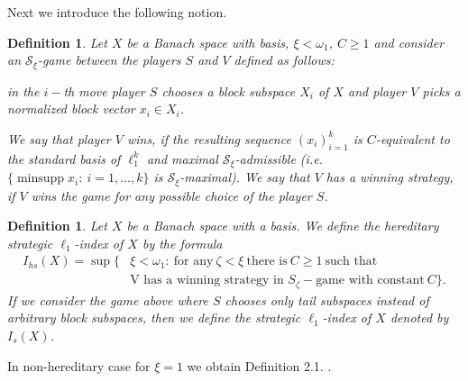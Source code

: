 \documentclass[a4paper]{amsart}
\theoremstyle{plain}
\newtheorem{definition}[theorem]{Definition}
\newcommand{\mc}{\mathcal}
\DeclareMathOperator{\minsupp}{minsupp}
\begin{document}
Next we introduce the following notion.
\begin{definition}
Let $X$ be a Banach space with basis, $\xi<\omega_{1}$, $C\geq 1$ and consider an
$\mc{S}_\xi$-game between the players $S$ and $V$ defined as follows:

in the $i-$th move player $S$ chooses a block subspace $X_i$ of $X$ and player $V$ picks a
normalized block vector $x_i\in X_i$.


We say that player $V$ wins, if the resulting sequence $(x_{i})_{i=1}^{k}$ is
$C$-equivalent to the standard basis of $\ell_{1}^{k}$ and maximal
$\mc{S}_{\xi}$-admissible (i.e.  $\{\minsupp x_i:\ i=1,\dots,k\}$ is
$\mc{S}_{\xi}$-maximal). We say that $V$ has a winning strategy, if $V$ wins the game for
any possible choice of the player $S$.
\end{definition}
\begin{definition}\label{hs}
Let $X$ be a Banach space with a basis. We define the \textit{hereditary strategic $\ell_{1}$-index} of $X$ by the formula
\begin{align*}
I_{hs}(X)= \sup\{&\xi<\omega_1:\ \text{for any}\ \zeta<\xi\ \text{there is}\ C\geq 1\ \text{such that}
\\
&\text{V has a winning strategy in }S_\zeta-\text{game with
constant}\ C\}.
\end{align*}
If we consider the game above where $S$ chooses only tail
subspaces instead of arbitrary block subspaces, then we define the
\textit{strategic $\ell_{1}$-index} of $X$ denoted by $I_s(X)$.
\end{definition}
In non-hereditary case for $\xi=1$ we obtain Definition 2.1.
\cite{MMT}.
\end{document}
